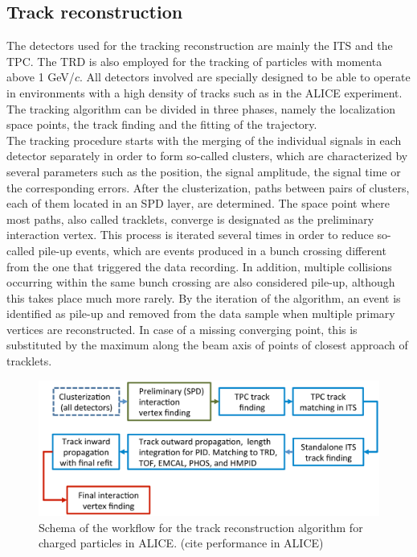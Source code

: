 \documentclass[12pt,a4paper]{report}
\begin{document}
\subsection{Track reconstruction}
\label{trakcrecon}
The detectors used for the tracking reconstruction are mainly the ITS and the TPC. The TRD is also employed for the tracking of particles with momenta above 1 GeV/$c$. All detectors involved are specially designed to be able to operate in environments with a high density of tracks such as in the ALICE experiment. The tracking algorithm can be divided in three phases, namely the localization space points, the track finding and the fitting of the trajectory.\\
The tracking procedure starts with the merging of the individual signals in each detector separately in order to form so-called clusters, which are characterized by several parameters such as the position, the signal amplitude, the signal time or the corresponding errors. After the clusterization, paths between pairs of clusters, each of them located in an SPD layer, are determined. The space point where most paths, also called tracklets, converge is designated as the preliminary interaction vertex. This process is iterated several times in order to reduce so-called pile-up events, which are events produced in a bunch crossing different from the one that triggered the data recording. In addition, multiple collisions occurring within the same bunch crossing are also considered pile-up, although this takes place much more rarely. By the iteration of the algorithm, an event is identified as pile-up and removed from the data sample when multiple primary vertices are reconstructed. In case of a missing converging point, this is substituted by the maximum along the beam axis of points of closest approach of tracklets.\\
\begin{figure}[tb!]
\centering
\includegraphics[width=14cm]{Plots/EventRecFlow.png}  
\caption{Schema of the workflow for the track reconstruction algorithm for charged particles in ALICE. (cite performance in ALICE) }
\label{eventflow}
\end{figure}
\end{document}
